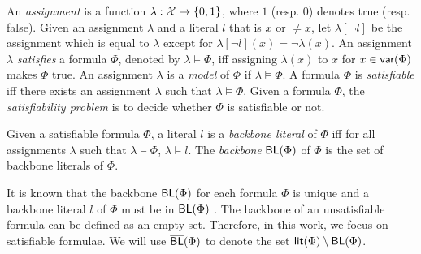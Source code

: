 An \emph{assignment} is a function $\lambda: \mathcal{X} \rightarrow \{0,1\}$, where $1$ (resp. $0$) denotes true (resp. false).
Given an assignment $\lambda$ and a literal $l$ that is $x$ or $\neq x$, let $\lambda[\neg l]$ be the assignment which is equal to $\lambda$
except for $\lambda[\neg l](x)=\neg \lambda(x)$.
An assignment $\lambda$ \emph{satisfies} a formula $\Phi$, denoted by $\lambda\models \Phi$, iff assigning $\lambda(x)$ to $x$ for $x\in\textsf{var}(\Phi)$ makes $\Phi$ true. 
An assignment $\lambda$ is a \emph{model} of $\Phi$ if $\lambda\models \Phi$.
A formula $\Phi$ is \emph{satisfiable} iff there exists an assignment $\lambda$ such that $\lambda\models \Phi$.
Given a formula $\Phi$, the \emph{satisfiability problem} is to decide whether $\Phi$ is satisfiable or not.

\smallskip

\begin{definition}[Backbone]
\label{def:backbone}
Given a satisfiable formula $\Phi$, a literal $l$ is a \emph{backbone literal} of $\Phi$ iff for all assignments $\lambda$ such that $\lambda\models\Phi$,
$\lambda\models l$. The \emph{backbone} $\textsf{BL}(\Phi)$ of $\Phi$ is the set of backbone literals of $\Phi$.
\end{definition}



It is known that the backbone $\textsf{BL}(\Phi)$ for each formula $\Phi$ is unique and a backbone literal $l$ of $\Phi$ must be in
$\textsf{BL}(\Phi)$ \cite{JLM15}.
The backbone of an unsatisfiable formula can be defined as an empty set. Therefore, in this work, we focus on satisfiable formulae.
We will use $\overline{\textsf{BL}}(\Phi)$ to denote the set
$\textsf{lit}(\Phi)\setminus \textsf{BL}(\Phi)$.

